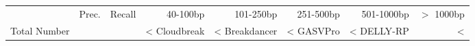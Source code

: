 \begin{table}[t]
\begin{center}
\begin{tabular}{rrr|rrrrr}
  \hline
 & Prec. & Recall & 40-100bp & 101-250bp & 251-500bp & 501-1000bp & $>$ 1000bp \\ 
Total Number & & & <%
  \hline
Cloudbreak & <%
Breakdancer & <%
  GASVPro & <%
  DELLY-RP & <%

\end{tabular}
\end{center}
\end{table}
